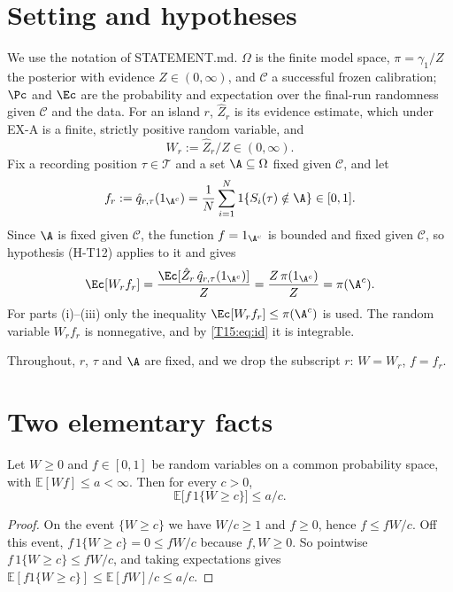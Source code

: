 \documentclass[11pt]{report}
\begin{document}
\section{Setting and hypotheses}

We use the notation of STATEMENT.md. $\Omega$ is the finite model space, $\pi=\gamma_1/Z$ the posterior with
evidence $Z\in(0,\infty)$, and $\mathcal C$ a successful frozen calibration; $\Pc$ and $\Ec$ are the probability and
expectation over the final-run randomness given $\mathcal C$ and the data. For an island $r$, $\hat Z_r$ is its
evidence estimate, which under EX-A is a finite, strictly positive random variable, and
\[
  W_r:=\hat Z_r/Z \in (0,\infty).
\]
Fix a recording position $\tau\in\mathcal T$ and a set $\A\subseteq\Omega$ fixed given $\mathcal C$, and let
\[
  f_r:=\hat q_{r,\tau}(1_{\A^c})=\frac1N\sum_{i=1}^N 1\{S_i(\tau)\notin\A\}\in[0,1].
\]
Since $\A$ is fixed given $\mathcal C$, the function $f=1_{\A^c}$ is bounded and fixed given $\mathcal C$, so
hypothesis (H-T12) applies to it and gives
\begin{equation}\label{T15:eq:id}
  \Ec[W_r f_r]=\frac{\Ec[\hat Z_r\,\hat q_{r,\tau}(1_{\A^c})]}{Z}=\frac{Z\,\pi(1_{\A^c})}{Z}=\pi(\A^c).
\end{equation}
For parts (i)--(iii) only the inequality $\Ec[W_rf_r]\le\pi(\A^c)$ is used. The random variable $W_rf_r$ is
nonnegative, and by \eqref{T15:eq:id} it is integrable.

Throughout, $r$, $\tau$ and $\A$ are fixed, and we drop the subscript $r$: $W=W_r$, $f=f_r$.

\section{Two elementary facts}

\begin{T15lemma}[Splitting at $c$]\label{T15:lem:split}
Let $W\ge0$ and $f\in[0,1]$ be random variables on a common probability space, with $\mathbb E[Wf]\le a<\infty$.
Then for every $c>0$,
\[
  \mathbb E\big[f\,1\{W\ge c\}\big]\le a/c .
\]
\end{T15lemma}
\begin{proof}
On the event $\{W\ge c\}$ we have $W/c\ge1$ and $f\ge0$, hence $f\le fW/c$. Off this event,
$f\,1\{W\ge c\}=0\le fW/c$ because $f,W\ge0$. So pointwise
$f\,1\{W\ge c\}\le fW/c$, and taking expectations gives $\mathbb E[f1\{W\ge c\}]\le \mathbb E[fW]/c\le a/c$.
\end{proof}
\end{document}
